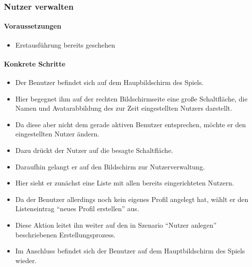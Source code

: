 \subsubsection{Nutzer verwalten}
\paragraph{Voraussetzungen}\mbox{}\newline 
\begin{itemize}
\item Erstausführung bereits geschehen
\end{itemize}

\paragraph{Konkrete Schritte}\mbox{}\newline
\begin{itemize}
\item Der Benutzer befindet sich auf dem Haupbildschirm des Spiels.
\item Hier begegnet ihm auf der rechten Bildschirmseite eine große Schaltfläche, 
die Namen und Avatarabbildung des zur Zeit eingestellten Nutzers darstellt.
\item Da diese aber nicht dem gerade aktiven Benutzer entsprechen, möchte er den eingestellten Nutzer ändern.
\item Dazu drückt der Nutzer auf die besagte Schaltfläche.
\item Daraufhin gelangt er auf den Bildschirm zur Nutzerverwaltung.
\item Hier sieht er zunächst eine Liste mit allen bereits 
eingerichteten Nutzern.
\item Da der Benutzer allerdings noch kein eigenes Profil
angelegt hat, wählt er den Listeneintrag ``neues Profil erstellen'' aus.
\item Diese Aktion leitet ihn weiter auf den in Szenario ``Nutzer anlegen''
beschriebenen Erstellungsprozess.
\item Im Anschluss befindet sich der Benutzer auf dem Hauptbildschirm des Spiels wieder.
\end{itemize}

